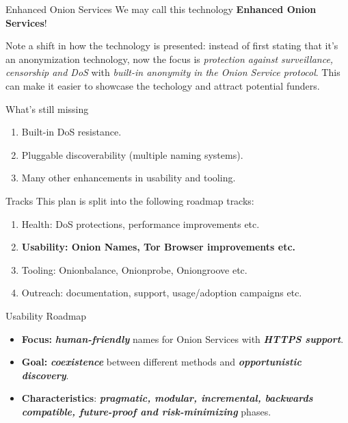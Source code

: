 \documentclass[
  ignorenonframetext,
]{beamer}
\providecommand{\tightlist}{%
  \setlength{\itemsep}{0pt}\setlength{\parskip}{0pt}}
\begin{document}
\begin{frame}{Enhanced Onion Services}
\protect\hypertarget{enhanced-onion-services}{}
We may call this technology \textbf{Enhanced Onion Services}!

Note a shift in how the technology is presented: instead of first
stating that it's an anonymization technology, now the focus is
\emph{protection against surveillance, censorship and DoS} with
\emph{built-in anonymity in the Onion Service protocol}. This can make
it easier to showcase the techology and attract potential funders.
\end{frame}

\begin{frame}{What's still missing}
\protect\hypertarget{whats-still-missing}{}
\begin{enumerate}
\tightlist
\item
  Built-in DoS resistance.
\item
  Pluggable discoverability (multiple naming systems).
\item
  Many other enhancements in usability and tooling.
\end{enumerate}
\end{frame}

\begin{frame}{Tracks}
\protect\hypertarget{tracks}{}
This plan is split into the following roadmap tracks:

\begin{enumerate}
\tightlist
\item
  Health: DoS protections, performance improvements etc.
\item
  \textbf{Usability: Onion Names, Tor Browser improvements etc.}
\item
  Tooling: Onionbalance, Onionprobe, Oniongroove etc.
\item
  Outreach: documentation, support, usage/adoption campaigns etc.
\end{enumerate}
\end{frame}

\begin{frame}{Usability Roadmap}
\protect\hypertarget{usability-roadmap}{}
\begin{itemize}
\tightlist
\item
  \textbf{Focus:} \textbf{\emph{human-friendly}} names for Onion
  Services with \textbf{\emph{HTTPS support}}.
\item
  \textbf{Goal:} \textbf{\emph{coexistence}} between different methods
  and \textbf{\emph{opportunistic discovery}}.
\item
  \textbf{Characteristics}: \textbf{\emph{pragmatic, modular,
  incremental, backwards compatible, future-proof and risk-minimizing}}
  phases.
\end{itemize}
\end{frame}
\end{document}
